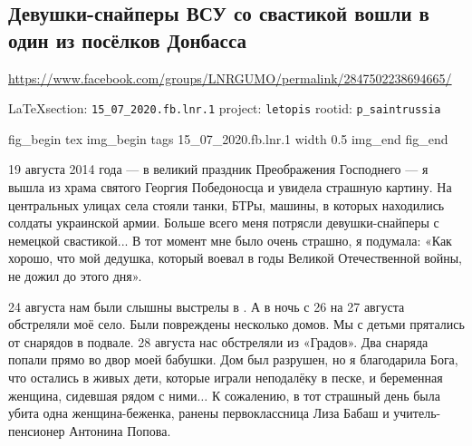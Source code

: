  
 
  
\subsection{Девушки-снайперы ВСУ со свастикой вошли в один из посёлков Донбасса}
\label{sec:15_07_2020.fb.lnr.1}
\url{https://www.facebook.com/groups/LNRGUMO/permalink/2847502238694665/}


\cite{15_07_2020.fb.lnr.1}

\vspace{0.5cm}
{\ifDEBUG\small\LaTeX section: \verb|15_07_2020.fb.lnr.1| project: \verb|letopis| rootid: \verb|p_saintrussia|\fi}
\vspace{0.5cm}

\ifcmt
fig_begin 
	tex \centering
  img_begin 
    tags 15_07_2020.fb.lnr.1
    width 0.5
  img_end
fig_end
\fi



19 августа 2014 года --- в великий праздник Преображения Господнего --- я вышла из
храма святого Георгия Победоносца и увидела страшную картину. На центральных
улицах села стояли танки, БТРы, машины, в которых находились солдаты украинской
армии. Больше всего меня потрясли девушки-снайперы с немецкой свастикой... В
тот момент мне было очень страшно, я подумала: «Как хорошо, что мой дедушка,
который воевал в годы Великой Отечественной войны, не дожил до этого дня».

24 августа нам были слышны выстрелы в . А в ночь с 26 на 27
августа обстреляли моё село. Были повреждены несколько домов. Мы с детьми
прятались от снарядов в подвале. 28 августа нас обстреляли из «Градов». Два
снаряда попали прямо во двор моей бабушки. Дом был разрушен, но я благодарила
Бога, что остались в живых дети, которые играли неподалёку в песке, и
беременная женщина, сидевшая рядом с ними$\ldots$ К сожалению, в тот страшный день
была убита одна женщина-беженка, ранены первоклассница Лиза Бабаш и
учитель-пенсионер Антонина Попова.


